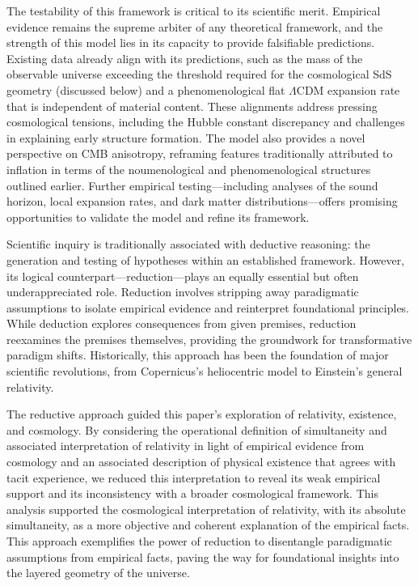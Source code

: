 \documentclass[aps,rmp,groupedaddress,twocolumn,10pt]{revtex4-2}
\begin{document}
The testability of this framework is critical to its scientific merit. Empirical evidence remains the supreme arbiter of any theoretical framework, and the strength of this model lies in its capacity to provide falsifiable predictions. Existing data already align with its predictions, such as the mass of the observable universe exceeding the threshold required for the cosmological SdS geometry (discussed below) and a phenomenological flat $\Lambda$CDM expansion rate that is independent of material content. These alignments address pressing cosmological tensions, including the Hubble constant discrepancy and challenges in explaining early structure formation. The model also provides a novel perspective on CMB anisotropy, reframing features traditionally attributed to inflation in terms of the noumenological and phenomenological structures outlined earlier. Further empirical testing---including analyses of the sound horizon, local expansion rates, and dark matter distributions---offers promising opportunities to validate the model and refine its framework.

Scientific inquiry is traditionally associated with deductive reasoning: the generation and testing of hypotheses within an established framework. However, its logical counterpart---reduction---plays an equally essential but often underappreciated role. Reduction involves stripping away paradigmatic assumptions to isolate empirical evidence and reinterpret foundational principles. While deduction explores consequences from given premises, reduction reexamines the premises themselves, providing the groundwork for transformative paradigm shifts. Historically, this approach has been the foundation of major scientific revolutions, from Copernicus's heliocentric model to Einstein's general relativity.

The reductive approach guided this paper's exploration of relativity, existence, and cosmology. By considering the operational definition of simultaneity and associated interpretation of relativity in light of empirical evidence from cosmology and an associated description of physical existence that agrees with tacit experience, we reduced this interpretation to reveal its weak empirical support and its inconsistency with a broader cosmological framework. This analysis supported the cosmological interpretation of relativity, with its absolute simultaneity, as a more objective and coherent explanation of the empirical facts. This approach exemplifies the power of reduction to disentangle paradigmatic assumptions from empirical facts, paving the way for foundational insights into the layered geometry of the universe.
\end{document}
